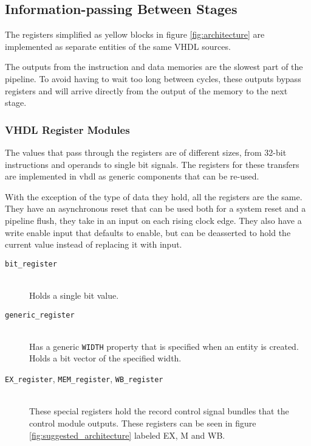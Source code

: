 \subsection{Information-passing Between Stages}
The registers simplified as yellow blocks in figure \ref{fig:architecture} are implemented as separate entities of the same VHDL sources.

The outputs from the instruction and data memories are the slowest part of the pipeline.
To avoid having to wait too long between cycles,
these outputs bypass registers and will arrive directly from the output of the memory to the next stage.

\subsubsection{VHDL Register Modules}
The values that pass through the registers are of different sizes,
from 32-bit instructions and operands to single bit signals.
The registers for these transfers are implemented in \gls{vhdl} as generic components that can be re-used.

With the exception of the type of data they hold,
all the registers are the same.
They have an asynchronous reset that can be used both for a system reset and a pipeline flush,
they take in an input on each rising clock edge.
They also have a write enable input that defaults to enable,
but can be deasserted to hold the current value instead of replacing it with input.

\begin{description}
    \item[\texttt{bit\_register}]
        \hfill\\
        Holds a single bit value.
    \item[\texttt{generic\_register}]
        \hfill\\
        Has a generic \texttt{WIDTH} property that is specified when an entity is created.
        Holds a bit vector of the specified width.
    \item[\texttt{EX\_register}, \texttt{MEM\_register}, \texttt{WB\_register}]
        \hfill\\
        These special registers hold the record control signal bundles that the control module outputs.
        These registers can be seen in figure \ref{fig:suggested_architecture} labeled EX, M and WB.
\end{description}

